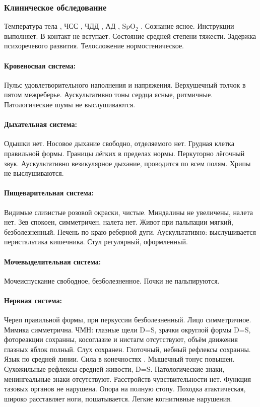 \documentclass[a4paper,14pt]{extarticle}
\newcommand{\oCelsius}{\tcdegree{}C}
\newcommand{\bpm}{уд/мин}
\newcommand{\mpm}{/мин}
\newcommand{\torr}{торр}
\begin{document}
\subsubsection*{Клиническое обследование}

Температура тела \numprint[\oCelsius]{36.6}, ЧСС \numprint[\bpm]{122}, ЧДД \numprint[\mpm]{29}, АД \numprint[\torr]{80/55}, SpO$_2$ .
Сознание ясное.
Инструкции выполняет.
В контакт не вступает.
Состояние средней степени тяжести.
Задержка психоречевого развития.
Телосложение нормостеническое.

\paragraph{Кровеносная система:} Пульс удовлетворительного наполнения и напряжения. Верхушечный толчок в пятом межреберье. Аускультативно тоны сердца ясные, ритмичные. Патологические шумы не выслушиваются.

\paragraph{Дыхательная система:} Одышки нет. Носовое дыхание свободно, отделяемого нет. Грудная клетка правильной формы. Границы лёгких в пределах нормы. Перкуторно лёгочный звук. Аускультативно везикулярное дыхание, проводится по всем полям. Хрипы не выслушиваются.

\paragraph{Пищеварительная система:} Видимые слизистые розовой окраски, чистые. Миндалины не увеличены, налета нет. Зев спокоен, симметричен, налета нет. Живот при пальпации мягкий, безболезненный. Печень по краю реберной дуги. Аускультативно: выслушивается перистальтика кишечника. Стул регулярный, оформленный.

\paragraph{Мочевыделительная система:} Мочеиспускание свободное, безболезненное. Почки не пальпируются.

\paragraph{Нервная система:} Череп правильной формы, при перкуссии безболезненный. Лицо симметричное. Мимика симметрична. ЧМН: глазные щели D=S, зрачки округлой формы D=S, фотореакции сохранны, косоглазие и нистагм отсутствуют, объём движения глазных яблок полный. Слух сохранен. Глоточный, небный рефлексы сохранны. Язык по средней линии. Сила в конечностях . Мышечный тонус повышен. Сухожильные рефлексы средней живости, D=S. Патологические знаки, менингеальные знаки отсутствуют. Расстройств чувствительности нет. Функция тазовых органов не нарушена. Опора на полную стопу. Походка атактическая, широко расставляет ноги, пошатывается. Легкие когнитивные нарушения.
\end{document}
